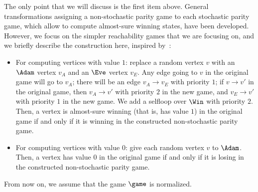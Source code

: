 The only point that we will discuss is the first item above. General
transformations assigning a non-stochastic parity game to each
stochastic parity game, which allow to compute almost-sure winning
states, have been developed.  However, we focus on the simpler reachability
games that we are focusing on, and we briefly describe the
construction here, inspired by~\cite{paulin-nathalie}:
\begin{itemize}
\item For computing vertices with value $1$: replace a random vertex
$v$ with an $\Adam$ vertex $v_A$ and an $\Eve$ vertex $v_E$. Any edge
going to $v$ in the original game will go to $v_A$; there will be an
edge $v_A \to v_E$ with priority $1$; if $v \to v'$ in the original
game, then $v_A \to v'$ with priority $2$ in the new game, and $v_E
\to v'$ with priority $1$ in the new game. We add a selfloop over
$\Win$ with priority $2$. Then, a vertex is almost-sure winning
(that is, has value $1$) in the original game if and only if it is
winning in the constructed non-stochastic parity game.
\item For computing vertices with value $0$: give each random vertex
$v$ to $\Adam$. Then, a vertex has value $0$ in the original game if
and only if it is losing in the constructed non-stochastic parity
game.
\end{itemize}





From now on, we assume that the game $\game$ is normalized.


